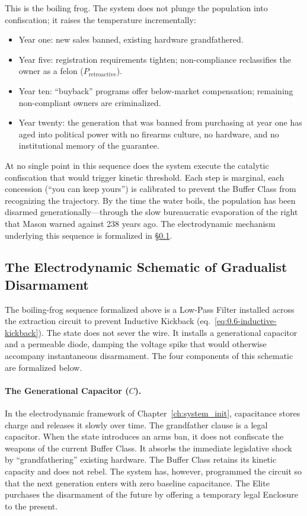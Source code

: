 This is the boiling frog. The system does not plunge the population into confiscation; it raises the temperature incrementally:
\begin{itemize}
    \item Year one: new sales banned, existing hardware grandfathered.
    \item Year five: registration requirements tighten; non-compliance reclassifies the owner as a felon ($P_{\text{retroactive}}$).
    \item Year ten: ``buyback'' programs offer below-market compensation; remaining non-compliant owners are criminalized.
    \item Year twenty: the generation that was banned from purchasing at year one has aged into political power with no firearms culture, no hardware, and no institutional memory of the guarantee.
\end{itemize}

At no single point in this sequence does the system execute the catalytic confiscation that would trigger kinetic threshold. Each step is marginal, each concession (``you can keep yours'') is calibrated to prevent the Buffer Class from recognizing the trajectory. By the time the water boils, the population has been disarmed generationally---through the slow bureaucratic evaporation of the right that Mason warned against 238 years ago. The electrodynamic mechanism underlying this sequence is formalized in \S\ref{subsec:electrodynamic_schematic}.

\subsection{The Electrodynamic Schematic of Gradualist Disarmament}
\label{subsec:electrodynamic_schematic}

The boiling-frog sequence formalized above is a Low-Pass Filter installed across the extraction circuit to prevent Inductive Kickback (eq.~\eqref{eq:0.6-inductive-kickback}). The state does not sever the wire. It installs a generational capacitor and a permeable diode, damping the voltage spike that would otherwise accompany instantaneous disarmament. The four components of this schematic are formalized below.

\paragraph{The Generational Capacitor ($C$).}
In the electrodynamic framework of Chapter~\ref{ch:system_init}, capacitance stores charge and releases it slowly over time. The grandfather clause is a legal capacitor. When the state introduces an arms ban, it does not confiscate the weapons of the current Buffer Class. It absorbs the immediate legislative shock by ``grandfathering'' existing hardware. The Buffer Class retains its kinetic capacity and does not rebel. The system has, however, programmed the circuit so that the next generation enters with zero baseline capacitance. The Elite purchases the disarmament of the future by offering a temporary legal Enclosure to the present.

